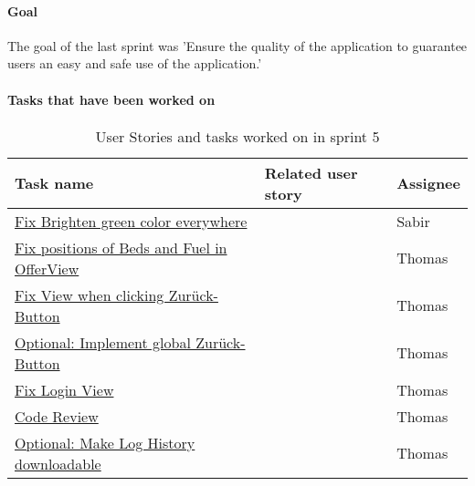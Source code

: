 \paragraph{Goal}
The goal of the last sprint was 'Ensure the quality of the application to guarantee users an easy and safe use of the 
application.'

\paragraph{Tasks that have been worked on \newline \newline}

\begin{table}[h]
    \centering
    \caption{User Stories and tasks worked on in sprint 5}
\begin{tabular}{|p{}|p{1cm}|p{}|}
    \hline
    {Task name} & {Related user story} & Assignee \\
    \hline
    \hline
	\hline
	\href{https://gitlab.rz.uni-bamberg.de/swt/teaching/2021-ws/swt-swl-b/group-a/-/issues/134}{Fix Brighten green color everywhere} &   & Sabir \\

	\hline
	\href{https://gitlab.rz.uni-bamberg.de/swt/teaching/2021-ws/swt-swl-b/group-a/-/issues/155}{Fix positions of Beds and Fuel in OfferView} &   & Thomas \\

    \hline
	\href{https://gitlab.rz.uni-bamberg.de/swt/teaching/2021-ws/swt-swl-b/group-a/-/issues/151}{Fix View when clicking Zurück-Button} &   & Thomas \\

    \hline
	\href{https://gitlab.rz.uni-bamberg.de/swt/teaching/2021-ws/swt-swl-b/group-a/-/issues/142}{Optional: Implement global Zurück-Button} &   & Thomas \\

    \hline
	\href{https://gitlab.rz.uni-bamberg.de/swt/teaching/2021-ws/swt-swl-b/group-a/-/issues/157}{Fix Login View} &   & Thomas \\

    \hline
	\href{https://gitlab.rz.uni-bamberg.de/swt/teaching/2021-ws/swt-swl-b/group-a/-/issues/95}{Code Review} &   & Thomas \\

    \hline
	\href{https://gitlab.rz.uni-bamberg.de/swt/teaching/2021-ws/swt-swl-b/group-a/-/issues/152}{Optional: Make Log History downloadable} &   & Thomas \\


\end{tabular}
\end{table}
